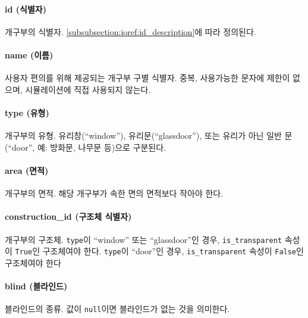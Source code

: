 
\paragraph{id (식별자)} 개구부의 식별자. \ref{subsubsection:ioref:id_description}에 따라 정의된다.

\paragraph{name (이름)} 사용자 편의를 위해 제공되는 개구부 구별 식별자. 중복, 사용가능한 문자에 제한이 없으며, 시뮬레이션에 직접 사용되지 않는다.

\paragraph{type (유형)} 개구부의 유형. 유리창(``window''), 유리문(``glassdoor''), 또는 유리가 아닌 일반 문(``door'', 예: 방화문, 나무문 등)으로 구분된다.

\paragraph{area (면적)} 개구부의 면적. 해당 개구부가 속한 면의 면적보다 작아야 한다.

\paragraph{construction\_id (구조체 식별자)} 개구부의 구조체. \texttt{type}이 ``window'' 또는 ``glassdoor''인 경우, \texttt{is\_transparent} 속성이 \texttt{True}인 구조체여야 한다. \texttt{type}이 ``door''인 경우, \texttt{is\_transparent} 속성이 \texttt{False}인 구조체여야 한다

\paragraph{blind (블라인드)} 블라인드의 종류. 값이 \texttt{null}이면 블라인드가 없는 것을 의미한다.

